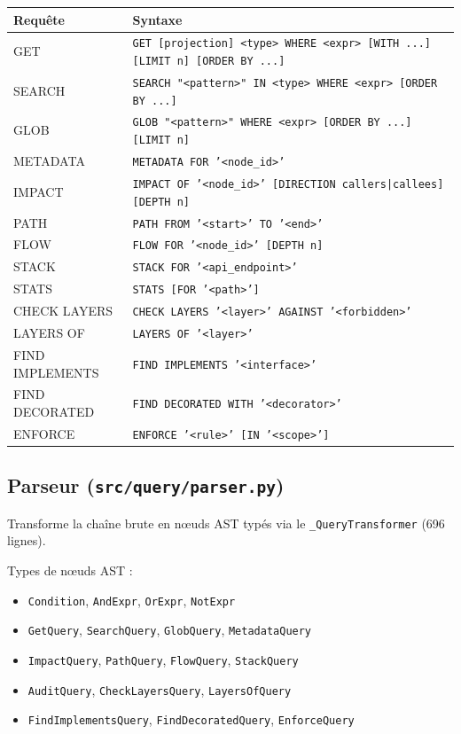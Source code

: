 \documentclass[12pt,a4paper]{article}
\newcommand{\code}[1]{\texttt{#1}}
\begin{document}
\begin{center}
\begin{tabularx}{\textwidth}{lX}
\toprule
\textbf{Requête} & \textbf{Syntaxe} \\
\midrule
GET & \code{GET [projection] <type> WHERE <expr> [WITH ...] [LIMIT n] [ORDER BY ...]} \\
SEARCH & \code{SEARCH "<pattern>" IN <type> WHERE <expr> [ORDER BY ...]} \\
GLOB & \code{GLOB "<pattern>" WHERE <expr> [ORDER BY ...] [LIMIT n]} \\
METADATA & \code{METADATA FOR '<node\_id>'} \\
IMPACT & \code{IMPACT OF '<node\_id>' [DIRECTION callers|callees] [DEPTH n]} \\
PATH & \code{PATH FROM '<start>' TO '<end>'} \\
FLOW & \code{FLOW FOR '<node\_id>' [DEPTH n]} \\
STACK & \code{STACK FOR '<api\_endpoint>'} \\
STATS & \code{STATS [FOR '<path>']} \\
CHECK LAYERS & \code{CHECK LAYERS '<layer>' AGAINST '<forbidden>'} \\
LAYERS OF & \code{LAYERS OF '<layer>'} \\
FIND IMPLEMENTS & \code{FIND IMPLEMENTS '<interface>'} \\
FIND DECORATED & \code{FIND DECORATED WITH '<decorator>'} \\
ENFORCE & \code{ENFORCE '<rule>' [IN '<scope>']} \\
\bottomrule
\end{tabularx}
\end{center}

\subsection{Parseur (\code{src/query/parser.py})}

Transforme la chaîne brute en nœuds AST typés via le \code{\_QueryTransformer} (696 lignes).

Types de nœuds AST :
\begin{itemize}
    \item \code{Condition}, \code{AndExpr}, \code{OrExpr}, \code{NotExpr}
    \item \code{GetQuery}, \code{SearchQuery}, \code{GlobQuery}, \code{MetadataQuery}
    \item \code{ImpactQuery}, \code{PathQuery}, \code{FlowQuery}, \code{StackQuery}
    \item \code{AuditQuery}, \code{CheckLayersQuery}, \code{LayersOfQuery}
    \item \code{FindImplementsQuery}, \code{FindDecoratedQuery}, \code{EnforceQuery}
\end{itemize}
\end{document}
